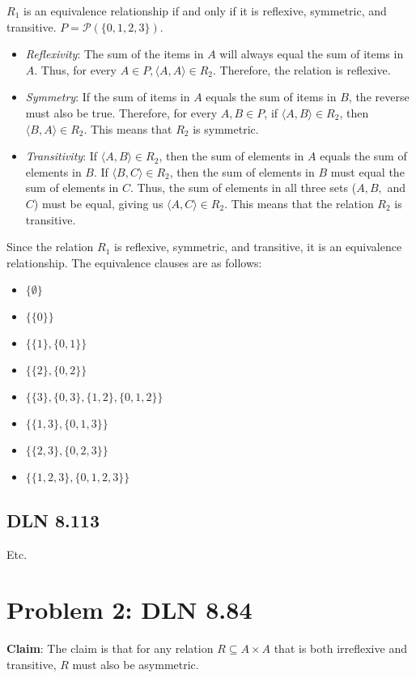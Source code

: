 \documentclass[titlepage]{article}
\begin{document}
$R_1$ is an equivalence relationship if and only if it is reflexive, symmetric, and transitive. $P = \mathcal{P}(\{0,1,2,3\})$. 
\begin{itemize}
\item \emph{Reflexivity}: The sum of the items in $A$ will always equal the sum of items in $A$. Thus, for every $A \in P, \langle A,A \rangle \in R_2$. Therefore, the relation is reflexive.
\item \emph{Symmetry}: If the sum of items in $A$ equals the sum of items in $B$, the reverse must also be true. Therefore, for every $A,B \in P$, if $\langle A,B \rangle \in R_2$, then $\langle B,A \rangle \in R_2$. This means that $R_2$ is symmetric. 
\item \emph{Transitivity}: If $\langle A,B \rangle \in R_2$, then the sum of elements in $A$ equals the sum of elements in $B$. If $\langle B,C \rangle \in R_2$, then the sum of elements in $B$ must equal the sum of elements in $C$. Thus, the sum of elements in all three sets ($A,B,$ and $C$) must be equal, giving us $\langle A,C \rangle \in R_2$. This means that the relation $R_2$ is transitive.
\end{itemize}
Since the relation $R_1$ is reflexive, symmetric, and transitive, it is an equivalence relationship. The equivalence clauses are as follows:
\begin{itemize}
\item $\{ \emptyset\} $
\item $\{ \{0\}\} $
\item $\{ \{1\}, \{0,1\}\} $
\item $\{ \{2\}, \{0,2\}\} $
\item $\{ \{3\}, \{0,3\}, \{1,2\}, \{0,1,2\}\} $
\item $\{ \{1,3\}, \{0,1,3\}\} $
\item $\{ \{2,3\}, \{0,2,3\}\} $
\item $\{ \{1,2,3\}, \{0,1,2,3\}\} $
\end{itemize}

\subsection{DLN 8.113} 

Etc.

\section{Problem 2: DLN 8.84}

\textbf{Claim}: The claim is that for any relation $R \subseteq A \times A$ that is both irreflexive and transitive, $R$ must also be asymmetric. 
\end{document}
